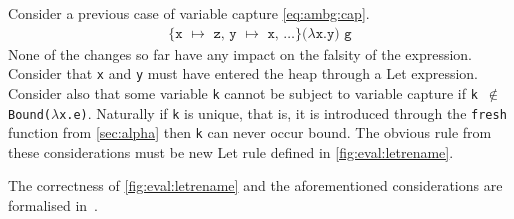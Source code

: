 Consider a previous case of variable capture \autoref{eq:ambg:cap}.
\begin{align}
  \texttt{\{x $\mapsto$ z, y $\mapsto$ x, $\dots$\}($\lambda$x.y) g}\label{eq:ambg:cap}
\end{align}
None of the changes so far have any impact on the falsity of the expression.
Consider that \texttt{x} and \texttt{y} must have entered the heap through a Let expression.
Consider also that some variable \texttt{k} cannot be subject to variable capture if \texttt{k $\notin$ Bound($\lambda$x.e)}.
Naturally if \texttt{k} is unique, that is, it is introduced through the \texttt{fresh} function from \autoref{sec:alpha} then \texttt{k} can never occur bound.
The obvious rule from these considerations must be new Let rule defined in \autoref{fig:eval:letrename}.
\begin{figure}[ht]
  \begin{mdframed}
    \begin{prooftree}
    \end{prooftree}   
  \end{mdframed}
  \caption{}
  \label{fig:eval:letrename}
\end{figure}
The correctness of \autoref{fig:eval:letrename} and the aforementioned considerations are formalised in~\cite{sestoft1997deriving}.


